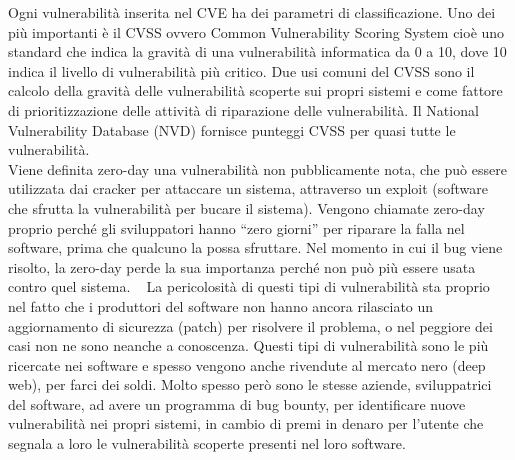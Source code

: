 Ogni vulnerabilità inserita nel CVE ha dei parametri di classificazione. 
Uno dei più importanti è il CVSS ovvero Common Vulnerability Scoring System 
cioè uno standard che indica la gravità di una vulnerabilità informatica 
da 0 a 10, dove 10 indica il livello di vulnerabilità più critico. 
Due usi comuni del CVSS sono il calcolo della gravità delle vulnerabilità 
scoperte sui propri sistemi e come fattore di prioritizzazione delle 
attività di riparazione delle vulnerabilità. Il National Vulnerability 
Database (NVD) fornisce punteggi CVSS per quasi tutte le vulnerabilità.\\

Viene definita zero-day una vulnerabilità non pubblicamente nota, che può 
essere utilizzata dai cracker per attaccare un sistema, attraverso un 
exploit (software che sfrutta la vulnerabilità per bucare il sistema). 
Vengono chiamate zero-day proprio perché gli sviluppatori hanno “zero giorni” 
per riparare la falla nel software, prima che qualcuno la possa sfruttare.
Nel momento in cui il bug viene risolto, la zero-day perde la sua importanza
perché non può più essere usata contro quel sistema. ~\cite{wiki:zero-day}
La pericolosità di questi tipi di vulnerabilità sta proprio nel fatto che i 
produttori del software non hanno ancora rilasciato un aggiornamento di sicurezza 
(patch) per risolvere il problema, o nel peggiore dei casi non ne sono 
neanche a conoscenza. 
Questi tipi di vulnerabilità sono le più ricercate nei software e spesso 
vengono anche rivendute al mercato nero (deep web), per farci dei soldi.
Molto spesso però sono le stesse aziende, sviluppatrici del software, ad avere 
un programma di bug bounty, per identificare nuove vulnerabilità nei propri
sistemi, in cambio di premi in denaro per l’utente che segnala a loro
le vulnerabilità scoperte presenti nel loro software.
